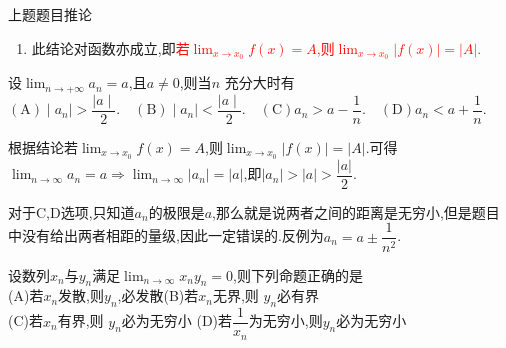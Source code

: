 \documentclass[8pt a4paper, oneside, UTF8]{ctexbook}
\begin{document}
\begin{sloppypar}
\begin{corollary}{上题题目推论}{}
\begin{enumerate}
            $$
            \lim_{n\to\infty}a_{n}=0\Leftrightarrow\lim_{n\to\infty}\lvert a_{n}\rvert=0\:,
            $$
            此结论常用,即若要证明$\lim _{n \to \infty}a_n=0$,可转换为证明$\lim_{n \to \infty}|a_n|=0$,由于$|a_n| \geq 0$,若使用了夹逼准则,只需证明$|a_n|\leqslant 0$即可
            \item 此结论对函数亦成立,即\textcolor{red}{若$\lim_{x\to x_0 }f\left(x\right)=A$,则$\lim_{x\to x_0}\left|f\left(x\right)\right|=\left|A\right|.$}
        \end{enumerate}
    \end{corollary}
    \begin{problem}
        设$\lim_{n \to +\infty} a_n=a$,且$a\neq0$,则当$n$ 充分大时有\\
        $\mathrm{(A)}\mid a_n\mid>\dfrac{\mid a\mid}{2}.\quad\mathrm{(B)}\mid a_n\mid<\dfrac{\mid a\mid}{2}.\quad\mathrm{(C)}a_n>a-\dfrac{1}{n}.\quad\mathrm{(D)}a_n<a+\dfrac{1}{n}.$
    \end{problem}
    \begin{solution}
        根据结论若$\lim_{x\to x_0 }f\left(x\right)=A$,则$\lim_{x\to x_0}\left|f\left(x\right)\right|=\left|A\right|.$可得$\lim_{n \to \infty}a_n=a \Rightarrow \lim_{n \to \infty}|a_n|=|a|$,即$|a_n|>|a| > \dfrac{|a|}{2}$.
    \end{solution}
    \begin{note}
        对于C,D选项,只知道$a_n$的极限是$a$,那么就是说两者之间的距离是无穷小,但是题目中没有给出两者相距的量级,因此一定错误的.反例为$a_n= a \pm \dfrac{1}{n^2}$.\label{pro3}
    \end{note} 
    \begin{problem}
        设数列${x_n} $与${y_n}$满足$\lim_{n \to \infty} x_ny_n=0$,则下列命题正确的是\\
        (A)若$x_n$发散,则$y_n$,必发散\quad (B)若$x_n$无界,则 $y_n$必有界\\
        (C)若$x_n$有界,则 $y_n$必为无穷小 \quad(D)若$\dfrac{1}{x_n}$为无穷小,则$y_{n}$必为无穷小
    \end{problem}
\end{sloppypar}
\end{document}
